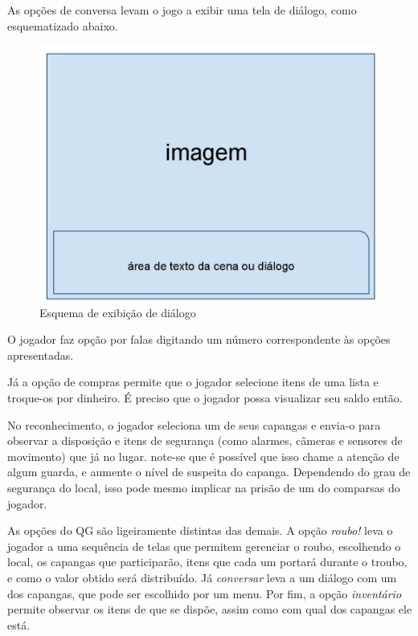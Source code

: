 As opções de conversa levam o jogo a exibir uma tela de diálogo, como esquematizado abaixo.

\begin{figure}
\centering
\includegraphics [width=\textwidth]{figuras/exemplo_imagem_dialogo.jpg}
\caption{Esquema de exibição de diálogo}
\label{esquemaDialogo}
\end{figure}

%
%
%

O jogador faz opção por falas digitando um número correspondente às opções apresentadas.

Já a opção de compras permite que o jogador selecione itens de uma lista e troque-os por dinheiro. É preciso que o jogador possa visualizar seu saldo então.

No reconhecimento, o jogador seleciona um de seus capangas e envia-o para observar a disposição e itens de segurança (como alarmes, câmeras e sensores de movimento) que já no lugar. note-se que é possível que isso chame a atenção de algum guarda, e aumente o nível de suspeita do capanga. Dependendo do grau de segurança do local, isso pode mesmo implicar na prisão de um do comparsas do jogador.

As opções do QG são ligeiramente distintas das demais. A opção \emph{roubo!} leva o jogador a uma sequência de telas que permitem gerenciar o roubo, escolhendo o local, os capangas que participarão, itens que cada um portará durante o troubo, e como o valor obtido será distribuído. Já \emph{conversar} leva a um diálogo com um dos capangas, que pode ser escolhido por um menu. Por fim, a opção \emph{inventário} permite observar os itens de que se dispõe, assim como com qual dos capangas ele está.

